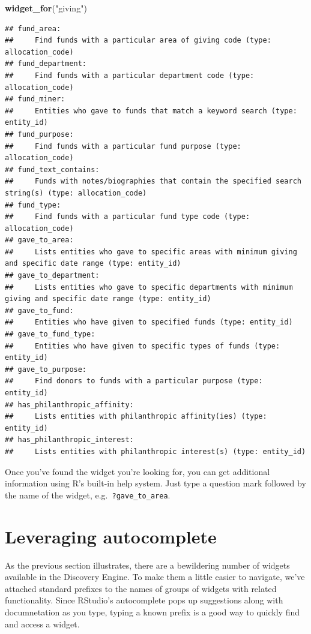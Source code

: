 \documentclass[]{book}
\newenvironment{Shaded}{\begin{snugshade}}{\end{snugshade}}
\newcommand{\KeywordTok}[1]{\textcolor[rgb]{0.13,0.29,0.53}{\textbf{#1}}}
\newcommand{\NormalTok}[1]{#1}
\newcommand{\StringTok}[1]{\textcolor[rgb]{0.31,0.60,0.02}{#1}}
\begin{document}
\begin{Shaded}
\begin{Highlighting}[]
\KeywordTok{widget_for}\NormalTok{(}\StringTok{"giving"}\NormalTok{)}
\end{Highlighting}
\end{Shaded}

\begin{verbatim}
## fund_area:
##     Find funds with a particular area of giving code (type: allocation_code)
## fund_department:
##     Find funds with a particular department code (type: allocation_code)
## fund_miner:
##     Entities who gave to funds that match a keyword search (type: entity_id)
## fund_purpose:
##     Find funds with a particular fund purpose (type: allocation_code)
## fund_text_contains:
##     Funds with notes/biographies that contain the specified search string(s) (type: allocation_code)
## fund_type:
##     Find funds with a particular fund type code (type: allocation_code)
## gave_to_area:
##     Lists entities who gave to specific areas with minimum giving and specific date range (type: entity_id)
## gave_to_department:
##     Lists entities who gave to specific departments with minimum giving and specific date range (type: entity_id)
## gave_to_fund:
##     Entities who have given to specified funds (type: entity_id)
## gave_to_fund_type:
##     Entities who have given to specific types of funds (type: entity_id)
## gave_to_purpose:
##     Find donors to funds with a particular purpose (type: entity_id)
## has_philanthropic_affinity:
##     Lists entities with philanthropic affinity(ies) (type: entity_id)
## has_philanthropic_interest:
##     Lists entities with philanthropic interest(s) (type: entity_id)
\end{verbatim}

Once you've found the widget you're looking for, you can get additional information using R's built-in help system. Just type a question mark followed by the name of the widget, e.g.~\texttt{?gave\_to\_area}.

\hypertarget{working-with-autocomplete}{%
\section{Leveraging autocomplete}\label{working-with-autocomplete}}

As the previous section illustrates, there are a bewildering number of widgets available in the Discovery Engine. To make them a little easier to navigate, we've attached standard prefixes to the names of groups of widgets with related functionality. Since RStudio's autocomplete pops up suggestions along with documnetation as you type, typing a known prefix is a good way to quickly find and access a widget.
\end{document}

